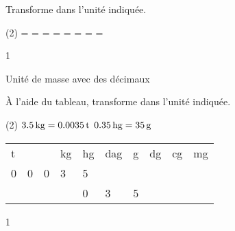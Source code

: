 \documentclass[a4paper,11pt]{report}
\begin{document}
\begin{exop}
{
	Transforme dans l'unité indiquée.
\begin{tasks}(2)
    \task {}= \dotfill \hspace{0.3cm}
     \hspace{0.3cm}
    \task {} = \dotfill \hspace{0.3cm}
     \hspace{0.3cm}
  \task {}= \dotfill \hspace{0.3cm}
    \tunit{}{\tonne} \hspace{0.3cm}
    \task {}= \dotfill \hspace{0.3cm}
     \hspace{0.3cm}
     \task {}= \dotfill \hspace{0.3cm}
    \tunit{}{\tonne} \hspace{0.3cm}
     \task {}= \dotfill \hspace{0.3cm}
     \hspace{0.3cm}
     \task {}= \dotfill \hspace{0.3cm}
     \hspace{0.3cm}
     \task {}= \dotfill \hspace{0.3cm}
     \hspace{0.3cm}
\end{tasks} 
}
{1}
\end{exop}

\begin{resolu}
    {Unité de masse avec des décimaux}
    {À l'aide du tableau, transforme dans l'unité indiquée.

\begin{tasks}(2)
   \task $\tunit{3,5}{\kilo g}= \tunit{0,0035}{\tonne}$
    \task $\tunit{0,35}{\hecto g} = \tunit{35}{\g}$
    
\end{tasks}
\begin{center}



\begin{tabular}{*{10}{|x{0.9cm}}|}
 \hline
  t & & & kg & hg & dag &g &dg &cg&mg\\   
0 & 0  &0 & 3&5 & & & & & \\ 
 \hline

 &   & & &0 &3 &5 & & & \\ 
\hline

\end{tabular}
\end{center}
    
    }
{1}
\end{resolu}
\end{document}
